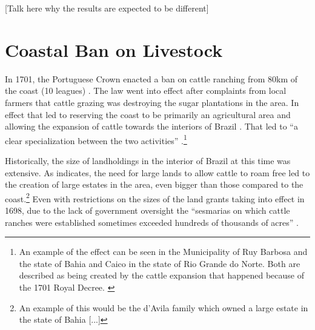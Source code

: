 \documentclass{article}
\begin{document}
[Talk here why the results are expected to be different]

\parencite{Mueller1995-gi}


\section{Coastal Ban on Livestock}

In 1701, the Portuguese Crown enacted a ban on cattle ranching from 80km of the coast (10 leagues) \parencites[p~.40]{Fausto2014-bh}[p~.198]{Simonsen2005-ps}[p~.460]{Bethell1984-of}. 
The law went into effect after complaints from local farmers that cattle grazing was destroying the sugar plantations in the area. 
In effect that led to reserving the coast to be primarily an agricultural area and allowing the expansion of cattle towards the interiors of Brazil \parencite[p.~216]{Junior1967-jv}.
That led to ``a clear specialization between the two activities'' \parencite{Ribeiro2012-lb}.\footnote{An example of the effect can be seen in the Municipality of Ruy Barbosa and the state of Bahia and Caico in the state of Rio Grande do Norte. Both are described as being created by the cattle expansion that happened because of the 1701 Royal Decree. \parencite{UnknownUnknown-ro}}


Historically, the size of landholdings in the interior of Brazil at this time was extensive. 
As \textcite[p~.41]{Fausto2014-bh} indicates, the need for large lands to allow cattle to roam free led to the creation of large estates in the area, even bigger than those compared to the coast.\footnote{An example of this would be the d'Avila family which owned a large estate in the state of Bahia [...]}
Even with restrictions on the sizes of the land grants taking into effect in 1698, due to the lack of government oversight the  ``sesmarias on which cattle ranches were established sometimes exceeded hundreds of thousands of acres'' \parencite{Bethell1984-of}.
\end{document}
